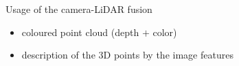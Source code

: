 \documentclass[pdf]{beamer}
\begin{document}
	\begin{frame}{Usage of the camera-LiDAR fusion}
			\begin{itemize}
				\item coloured point cloud (depth $+$ color)
				\item description of the $3$D points by the image features
			\end{itemize}
		
			\begin{minipage}{0.18\textwidth}
		\begin{figure}[h]
			\centering
			\\

\end{figure}
\end{minipage}
\end{frame}
\end{document}
